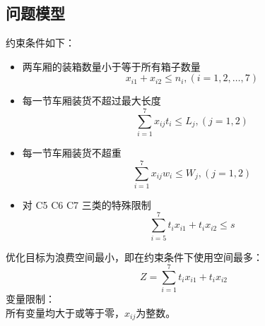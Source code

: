 \documentclass[11pt,a4paper]{article}
\begin{document}
\begin{CJK}{UTF8}{gkai}
	\subsection{问题模型}
	约束条件如下：
	\begin{itemize}
	\item 两车厢的装箱数量小于等于所有箱子数量
		\[ x_{i1} + x_{i2} \leqslant n_i , ( i = 1,2,\ldots,7) \]
	\item 每一节车厢装货不超过最大长度
		\[ \sum_{i=1}^7 x_{ij} t_i \leq L_j , (j = 1,2 ) \]
	\item 每一节车厢装货不超重
		\[ \sum_{i=1}^7 x_{ij} w_i \leq W_j , (j = 1,2) \]
	\item 对 C5 C6 C7 三类的特殊限制
		\[ \sum_{i=5}^7 t_i x_{i1} + t_i x_{i2} \leq s \]
	\end{itemize}
	优化目标为浪费空间最小，即在约束条件下使用空间最多：
	\begin{equation}
		Z = \sum_{i=1}^7 t_i x_{i1} + t_i x_{i2}
	\end{equation}
	变量限制：\\
		所有变量均大于或等于零，$x_{ij}$为整数。


\end{CJK}
\end{document}
